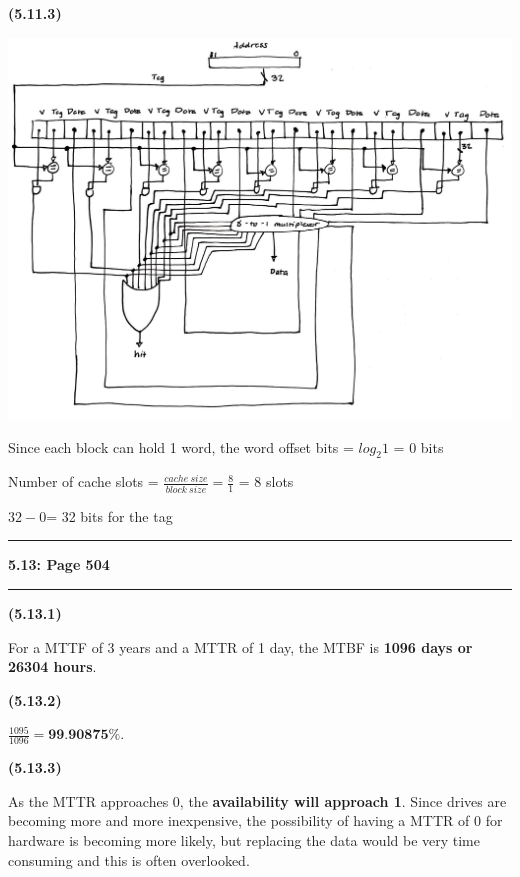 \documentclass[11pt]{article}
\newcommand\question[2]{\vspace{.25in}\hrule\textbf{#1: #2}\vspace{.5em}\hrule\vspace{.10in}}
\renewcommand\part[1]{\vspace{.10in}\textbf{(#1)}\par}
\begin{document}
	\part{5.11.3}
		\includegraphics[width=\textwidth]{images/yeet(2).png}\par
		Since each block can hold 1 word, the word offset bits = $log_{2}1$ = 0 bits\par
		Number of cache slots = $\frac{cache\:size}{block\:size} = \frac{8}{1}$ = 8 slots\par
		$32-0$= 32 bits for the tag \par


\question{5.13}{Page 504} %

	\part{5.13.1}
		For a MTTF of 3 years and a MTTR of 1 day, the MTBF is \textbf{1096 days or 26304 hours}.\par
	
	\part{5.13.2}
		$\frac{1095}{1096}=\textbf{99.90875\%}.$\par
	
	\part{5.13.3}
		As the MTTR approaches 0, the \textbf{availability will approach 1}. Since drives are becoming more and more inexpensive, the possibility of having a MTTR of 0 for hardware is becoming more likely, but replacing the data would be very time consuming and this is often overlooked.\par
	
\end{document}
